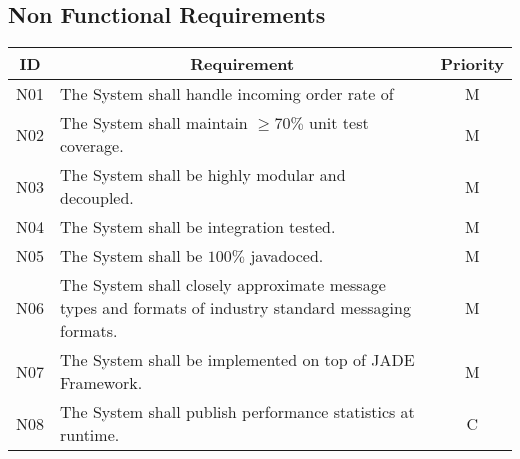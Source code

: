 \subsection{Non Functional Requirements}


\begin{table}[htbp]
\begin{center}
\begin{longtable}{c p{4.2in} c }

\multicolumn{1}{c}{\textbf{ID}}           &
\multicolumn{1}{c}{\textbf{Requirement}}  &
\multicolumn{1}{c}{\textbf{Priority}}     \\        
\toprule

N01  & The System shall handle incoming order rate of              & M \\
N02  & The System shall maintain $\geq70\%$ unit test coverage.    & M \\
N03  & The System shall be highly modular and decoupled.           & M \\
N04  & The System shall be integration tested.	                   & M \\
N05  & The System shall be $100\%$ javadoced.	                   & M \\
N06  & The System shall closely approximate message types and formats of industry standard messaging formats. & M \\
N07  & The System shall be implemented on top of JADE Framework.   & M \\
N08  & The System shall publish performance statistics at runtime. & C \\
 
\end{longtable}
\end{center}
\end{table}

